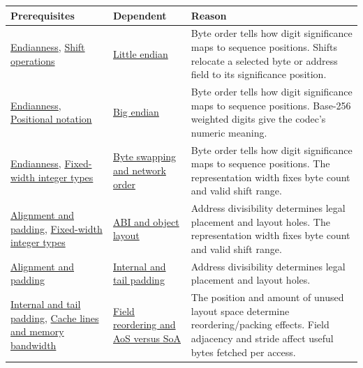 {\def\LTcaptype{none} %
\begin{longtable}[]{@{}
  >{\raggedright\arraybackslash}p{}
  >{\raggedright\arraybackslash}p{}
  >{\raggedright\arraybackslash}p{}@{}}
\toprule\noalign{}
\begin{minipage}[b]{\linewidth}\raggedright
Prerequisites
\end{minipage} & \begin{minipage}[b]{\linewidth}\raggedright
Dependent
\end{minipage} & \begin{minipage}[b]{\linewidth}\raggedright
Reason
\end{minipage} \\
\midrule\noalign{}
\endhead
\bottomrule\noalign{}
\endlastfoot
\hyperref[appendix-bc07c3d25b18]{Endianness}, \hyperref[appendix-73425b25118e]{Shift operations} & \hyperref[appendix-367b6abf460e]{Little endian} & Byte order tells how digit significance maps to sequence positions. Shifts relocate a selected byte or address field to its significance position. \\
\hyperref[appendix-bc07c3d25b18]{Endianness}, \hyperref[appendix-83c3f28f7bda]{Positional notation} & \hyperref[appendix-92e040df969a]{Big endian} & Byte order tells how digit significance maps to sequence positions. Base-256 weighted digits give the codec's numeric meaning. \\
\hyperref[appendix-bc07c3d25b18]{Endianness}, \hyperref[appendix-cc04044b5782]{Fixed-width integer types} & \hyperref[appendix-11ba36693aa2]{Byte swapping and network order} & Byte order tells how digit significance maps to sequence positions. The representation width fixes byte count and valid shift range. \\
\hyperref[appendix-a1f7c53b4742]{Alignment and padding}, \hyperref[appendix-cc04044b5782]{Fixed-width integer types} & \hyperref[appendix-c4ac6bb0fff8]{ABI and object layout} & Address divisibility determines legal placement and layout holes. The representation width fixes byte count and valid shift range. \\
\hyperref[appendix-a1f7c53b4742]{Alignment and padding} & \hyperref[appendix-f52f8c5a3afd]{Internal and tail padding} & Address divisibility determines legal placement and layout holes. \\
\hyperref[appendix-f52f8c5a3afd]{Internal and tail padding}, \hyperref[appendix-e4ccdbab8320]{Cache lines and memory bandwidth} & \hyperref[appendix-5522ad176ca0]{Field reordering and AoS versus SoA} & The position and amount of unused layout space determine reordering/packing effects. Field adjacency and stride affect useful bytes fetched per access. \\

\end{longtable}}
